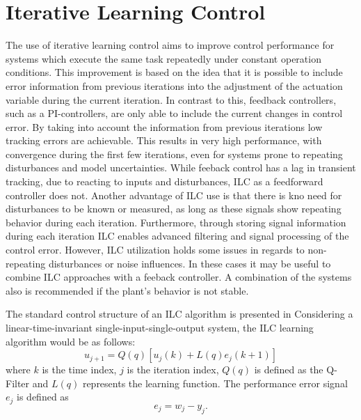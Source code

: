 \section{Iterative Learning Control}
The use of iterative learning control aims to improve control performance for systems which execute the same task repeatedly under constant operation conditions. This improvement is based on the idea that it is possible to include error information from previous iterations into the adjustment of the actuation variable during the current iteration. In contrast to this, feedback controllers, such as a PI-controllers, are only able to include the current changes in control error. By taking into account the information from previous iterations low tracking errors are achievable. This results in very high performance, with convergence during the first few iterations, even for systems prone to repeating disturbances and model uncertainties. While feeback control has a lag in transient tracking, due to reacting to inputs and disturbances, ILC as a feedforward controller does not. Another advantage of ILC use is that there is kno need for disturbances to be known or measured, as long as these signals show repeating behavior during each iteration. Furthermore, through storing signal information during each iteration ILC enables advanced filtering and signal processing of the control error. However, ILC utilization holds some issues in regards to non-repeating disturbances or noise influences. In these cases it may be useful to combine ILC approaches with a feeback controller. A combination of the systems also is recommended if the plant's behavior is not stable. \cite{ILC2}

The standard control structure of an ILC algorithm is presented in %
Considering a linear-time-invariant single-input-single-output system, the ILC learning algorithm would be as follows:
\begin{equation}
    u_{j+1}  = Q(q)[u_{j}(k)+L(q)e_{j}(k+1)]
 \label{eq:ILC_standard}
\end{equation}
where $k$ is the time index, $j$ is the iteration index, $Q(q)$ is defined as the Q-Filter and $L(q)$ represents the learning function. The performance error signal $e_{j}$ is defined as
\begin{equation}
    e_{j}  = w_{j}-y_{j}.
 \label{eq:perf_error}
\end{equation}
